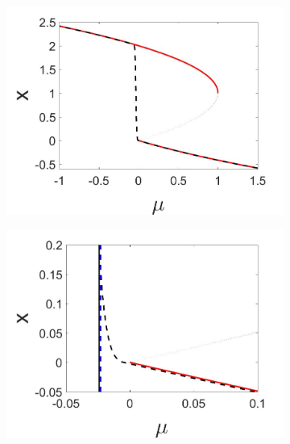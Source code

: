 \begin{figure}[H]
\centering
\begin{subfigure}{.5\textwidth}
 \centering
 \includegraphics[width=\linewidth]{oneD/slow_bif_diagram.jpg}
 \caption{}
\end{subfigure}%
\begin{subfigure}{.5\textwidth}
 \centering
 \includegraphics[width=\linewidth]{oneD/slow_bif_diagram_zoom.jpg}
 \caption{}
\end{subfigure}
\begin{subfigure}{.5\textwidth}
\centering

\end{subfigure}
\end{figure}
